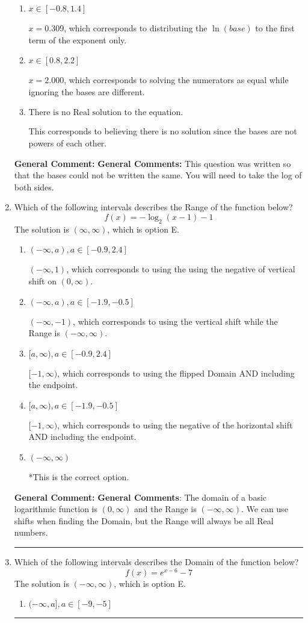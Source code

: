 \documentclass{extbook}[14pt]
\newcommand{\litem}[1]{\item #1

\rule{\textwidth}{0.4pt}}
\begin{document}
\begin{enumerate}
{\begin{enumerate}[label=\Alph*.]
$x = -10.175$, which corresponds to distributing the $\ln(base)$ to the second term of the exponent only.
\item \( x \in [-0.8, 1.4] \)

$x = 0.309$, which corresponds to distributing the $\ln(base)$ to the first term of the exponent only.
\item \( x \in [0.8, 2.2] \)

$x = 2.000$, which corresponds to solving the numerators as equal while ignoring the bases are different.
\item \( \text{There is no Real solution to the equation.} \)

This corresponds to believing there is no solution since the bases are not powers of each other.
\end{enumerate}

\textbf{General Comment:} \textbf{General Comments:} This question was written so that the bases could not be written the same. You will need to take the log of both sides.
}
\litem{
Which of the following intervals describes the Range of the function below?
\[ f(x) = -\log_2{(x-1)}-1 \]The solution is \( (\infty, \infty) \), which is option E.\begin{enumerate}[label=\Alph*.]
\item \( (-\infty, a), a \in [-0.9, 2.4] \)

$(-\infty, 1)$, which corresponds to using the using the negative of vertical shift on $(0, \infty)$.
\item \( (-\infty, a), a \in [-1.9, -0.5] \)

$(-\infty, -1)$, which corresponds to using the vertical shift while the Range is $(-\infty, \infty)$.
\item \( [a, \infty), a \in [-0.9, 2.4] \)

$[-1, \infty)$, which corresponds to using the flipped Domain AND including the endpoint.
\item \( [a, \infty), a \in [-1.9, -0.5] \)

$[-1, \infty)$, which corresponds to using the negative of the horizontal shift AND including the endpoint.
\item \( (-\infty, \infty) \)

*This is the correct option.
\end{enumerate}

\textbf{General Comment:} \textbf{General Comments}: The domain of a basic logarithmic function is $(0, \infty)$ and the Range is $(-\infty, \infty)$. We can use shifts when finding the Domain, but the Range will always be all Real numbers.
}
\litem{
Which of the following intervals describes the Domain of the function below?
\[ f(x) = e^{x-6}-7 \]The solution is \( (-\infty, \infty) \), which is option E.\begin{enumerate}[label=\Alph*.]
\item \( (-\infty, a], a \in [-9, -5] \)


\end{enumerate}}
\end{enumerate}
\end{document}
